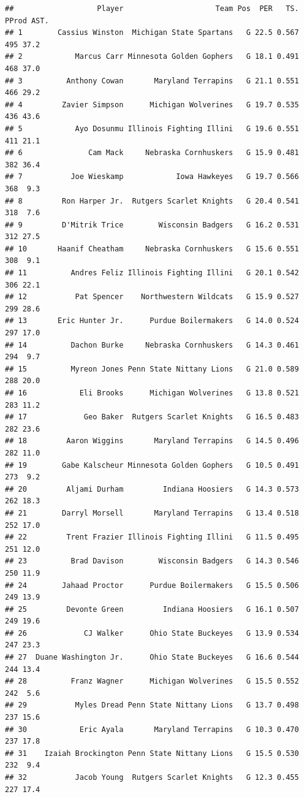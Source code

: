 \documentclass[
]{book}
\begin{document}
\begin{verbatim}
##                   Player                     Team Pos  PER   TS. PProd AST.
## 1        Cassius Winston  Michigan State Spartans   G 22.5 0.567   495 37.2
## 2            Marcus Carr Minnesota Golden Gophers   G 18.1 0.491   468 37.0
## 3          Anthony Cowan       Maryland Terrapins   G 21.1 0.551   466 29.2
## 4         Zavier Simpson      Michigan Wolverines   G 19.7 0.535   436 43.6
## 5            Ayo Dosunmu Illinois Fighting Illini   G 19.6 0.551   411 21.1
## 6               Cam Mack     Nebraska Cornhuskers   G 15.9 0.481   382 36.4
## 7           Joe Wieskamp            Iowa Hawkeyes   G 19.7 0.566   368  9.3
## 8         Ron Harper Jr.  Rutgers Scarlet Knights   G 20.4 0.541   318  7.6
## 9         D'Mitrik Trice        Wisconsin Badgers   G 16.2 0.531   312 27.5
## 10       Haanif Cheatham     Nebraska Cornhuskers   G 15.6 0.551   308  9.1
## 11          Andres Feliz Illinois Fighting Illini   G 20.1 0.542   306 22.1
## 12           Pat Spencer    Northwestern Wildcats   G 15.9 0.527   299 28.6
## 13       Eric Hunter Jr.      Purdue Boilermakers   G 14.0 0.524   297 17.0
## 14          Dachon Burke     Nebraska Cornhuskers   G 14.3 0.461   294  9.7
## 15          Myreon Jones Penn State Nittany Lions   G 21.0 0.589   288 20.0
## 16            Eli Brooks      Michigan Wolverines   G 13.8 0.521   283 11.2
## 17             Geo Baker  Rutgers Scarlet Knights   G 16.5 0.483   282 23.6
## 18         Aaron Wiggins       Maryland Terrapins   G 14.5 0.496   282 11.0
## 19        Gabe Kalscheur Minnesota Golden Gophers   G 10.5 0.491   273  9.2
## 20         Aljami Durham         Indiana Hoosiers   G 14.3 0.573   262 18.3
## 21        Darryl Morsell       Maryland Terrapins   G 13.4 0.518   252 17.0
## 22         Trent Frazier Illinois Fighting Illini   G 11.5 0.495   251 12.0
## 23          Brad Davison        Wisconsin Badgers   G 14.3 0.546   250 11.9
## 24        Jahaad Proctor      Purdue Boilermakers   G 15.5 0.506   249 13.9
## 25         Devonte Green         Indiana Hoosiers   G 16.1 0.507   249 19.6
## 26             CJ Walker      Ohio State Buckeyes   G 13.9 0.534   247 23.3
## 27  Duane Washington Jr.      Ohio State Buckeyes   G 16.6 0.544   244 13.4
## 28          Franz Wagner      Michigan Wolverines   G 15.5 0.552   242  5.6
## 29           Myles Dread Penn State Nittany Lions   G 13.7 0.498   237 15.6
## 30            Eric Ayala       Maryland Terrapins   G 10.3 0.470   237 17.8
## 31    Izaiah Brockington Penn State Nittany Lions   G 15.5 0.530   232  9.4
## 32           Jacob Young  Rutgers Scarlet Knights   G 12.3 0.455   227 17.4

\end{verbatim}
\end{document}

